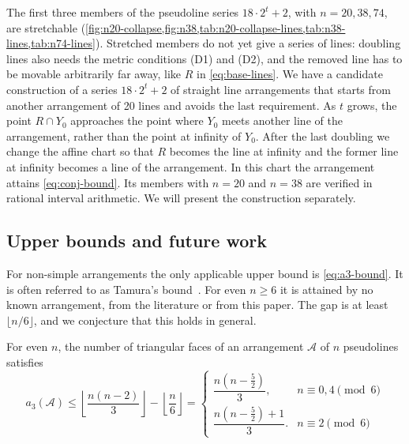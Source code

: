 The first three members of the pseudoline series $18\cdot2^t+2$, with $n=20,38,74$, are stretchable (\cref{fig:n20-collapse,fig:n38,tab:n20-collapse-lines,tab:n38-lines,tab:n74-lines}). Stretched members do not yet give a series of lines: doubling lines also needs the metric conditions (D1) and (D2), and the removed line has to be movable arbitrarily far away, like $R$ in \eqref{eq:base-lines}.
We have a candidate construction of a series $18\cdot2^t+2$ of straight line arrangements that starts from another arrangement of 20 lines and avoids the last requirement. As $t$ grows, the point $R\cap Y_0$ approaches the point where $Y_0$ meets another line of the arrangement, rather than the point at infinity of $Y_0$. After the last doubling we change the affine chart so that $R$ becomes the line at infinity and the former line at infinity becomes a line of the arrangement. In this chart the arrangement attains \eqref{eq:conj-bound}. Its members with $n=20$ and $n=38$ are verified in rational interval arithmetic. We will present the construction separately.

\subsection{Upper bounds and future work}\label{sec:upper-bounds}

For non-simple arrangements the only applicable upper bound is \eqref{eq:a3-bound}.
It is often referred to as Tamura's bound~\cite{cb07}.
For even $n\ge6$ it is attained by no known arrangement, from the literature or from this paper.
The gap is at least $\lfloor n/6\rfloor$, and we conjecture that this holds in general.

\begin{conjecture}\label{conj:bound}
For even $n$, the number of triangular faces of an arrangement $\mathcal{A}$ of $n$ pseudolines satisfies
\begin{equation}\label{eq:conj-bound-2}
a_{3}(\mathcal{A})\le\left\lfloor\dfrac{n(n - 2)}{3}\right\rfloor-\left\lfloor\dfrac{n}{6}\right\rfloor=\begin{cases}
\dfrac{n(n - \frac52)}{3}, & n\equiv0,4\pmod 6 \\
\dfrac{n(n - \frac52) + 1}{3}. &  n\equiv2\pmod 6
\end{cases}
\end{equation}
\end{conjecture}

